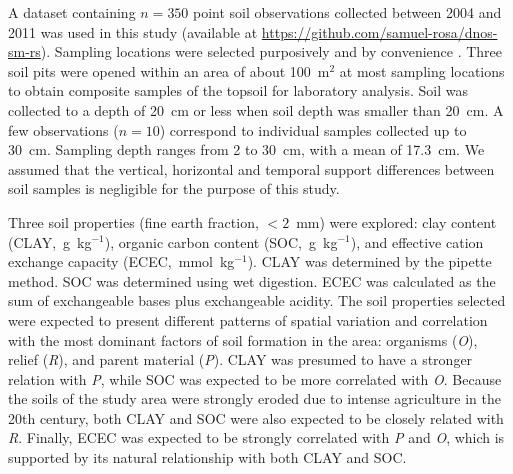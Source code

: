 A dataset containing $n=350$ point soil observations collected between 2004 and 2011 
\citep{PedronEtAl2006b, SamuelRosaEtAl2011a, MiguelEtAl2012, Samuel-RosaEtAl2013}
was used in this study (available at 
\url{https://github.com/samuel-rosa/dnos-sm-rs}). Sampling locations were 
selected purposively and by convenience \citep{Samuel-RosaEtAl2014b}. Three soil
pits were opened within an area of about 100~m$^2$ at most sampling locations to
obtain composite samples of the topsoil for laboratory analysis. Soil was 
collected to a depth of 20~cm or less when soil depth was smaller than 20~cm.
A few observations ($n=10$) correspond to individual samples collected up to 
30~cm. Sampling depth ranges from 2 to 30~cm, with a mean of 17.3~cm. We assumed
that the vertical, horizontal and temporal support differences between soil 
samples is negligible for the purpose of this study.

Three soil properties (fine earth fraction, $<2$~mm) were explored: clay content
(CLAY,~g~kg$^{-1}$), organic carbon content (SOC,~g~kg$^{-1}$), and effective 
cation exchange capacity (ECEC,~mmol~kg$^{-1}$). CLAY was determined by the 
pipette method. SOC was determined using wet digestion. ECEC was calculated as 
the sum of exchangeable bases plus exchangeable acidity. The soil properties 
selected were expected to present different patterns of spatial variation and 
correlation with the most dominant factors of soil formation \citep{Jenny1941} 
in the area: organisms (\textit{O}), relief (\textit{R}), and parent material 
(\textit{P}). CLAY was presumed to have a stronger relation with \textit{P}, 
while SOC was expected to be more correlated with \textit{O}. Because the soils 
of the study area were strongly eroded due to intense agriculture in the 20th 
century, both CLAY and SOC were also expected to be closely related with 
\textit{R}. Finally, ECEC was expected to be strongly correlated with \textit{P}
and \textit{O}, which is supported by its natural relationship with both CLAY 
and SOC.

